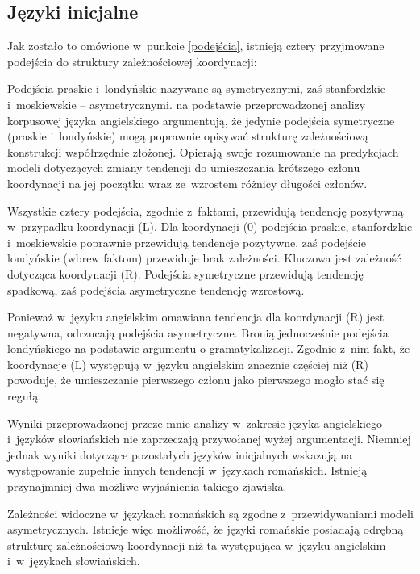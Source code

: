 \subsection{Języki inicjalne}

Jak zostało to omówione w~punkcie \ref{podejścia}, istnieją cztery przyjmowane podejścia do struktury zależnościowej koordynacji:



Podejścia praskie i~londyńskie nazywane są symetrycznymi, zaś stanfordzkie i~moskiewskie -- asymetrycznymi. \cite{przepiorkowski2023conjunct} na podstawie przeprowadzonej analizy korpusowej języka angielskiego argumentują, że jedynie podejścia symetryczne (praskie i~londyńskie) mogą poprawnie opisywać strukturę zależnościową konstrukcji współrzędnie złożonej. Opierają swoje rozumowanie na predykcjach modeli dotyczących zmiany tendencji do umieszczania krótszego członu koordynacji na jej początku wraz ze~wzrostem różnicy długości członów.

Wszystkie cztery podejścia, zgodnie z~faktami, przewidują tendencję pozytywną w~przypadku koordynacji (L). Dla koordynacji (0) podejścia praskie, stanfordzkie i~moskiewskie poprawnie przewidują tendencje pozytywne, zaś podejście londyńskie (wbrew faktom) przewiduje brak zależności. Kluczowa jest zależność dotycząca koordynacji (R). Podejścia symetryczne przewidują tendencję spadkową, zaś podejścia asymetryczne tendencję wzrostową.

Ponieważ w~języku angielskim omawiana tendencja dla koordynacji (R) jest negatywna, \cite{przepiorkowski2023conjunct} odrzucają podejścia asymetryczne. Bronią jednocześnie podejścia londyńskiego na podstawie argumentu o gramatykalizacji. Zgodnie z~nim fakt, że koordynacje (L) występują w~języku angielskim znacznie częściej niż (R) powoduje, że umieszczanie pierwszego członu jako pierwszego mogło stać się regułą.

Wyniki przeprowadzonej przeze mnie analizy w~zakresie języka angielskiego i~języków słowiańskich nie zaprzeczają przywołanej wyżej argumentacji. Niemniej jednak wyniki dotyczące pozostałych języków inicjalnych wskazują na występowanie zupełnie innych tendencji w~językach romańskich. Istnieją przynajmniej dwa możliwe wyjaśnienia takiego zjawiska.

Zależności widoczne w~językach romańskich są zgodne z~przewidywaniami modeli asymetrycznych. Istnieje więc możliwość, że języki romańskie posiadają odrębną strukturę zależnościową koordynacji niż ta występująca w~języku angielskim i~w~językach słowiańskich.

